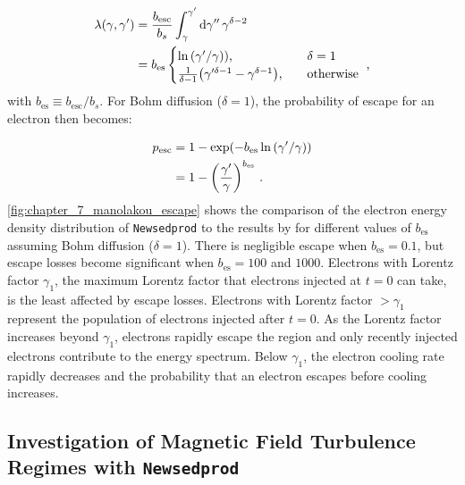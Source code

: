 \begin{equation}
    \begin{aligned}
   	 \lambda\qty(\gamma,\gamma')&=\frac{b_\text{esc}}{b_s}\int_\gamma^{\gamma'}\dd{\gamma''}\gamma^{\delta-2} \\
  	  &=b_\text{es}
  	  \begin{cases}
  		  \ln\qty({\gamma'}/{\gamma}))\text{,}\quad &\delta =1 \\
  		  \frac{1}{\delta-1}\qty(\gamma'^{\delta-1}-\gamma^{\delta -1})\text{,}\quad&\text{otherwise}
    	\end{cases}\text{ ,}
    \end{aligned} \label{eq:chapter_7_lambda_plus_diffusion}
\end{equation}
\noindent with $b_\text{es}\equiv b_\text{esc}/b_s$. For Bohm diffusion ($\delta=1$), the probability of escape for an electron then becomes:

\begin{equation}
    \begin{aligned}
    p_\text{esc}&=1-\exp(-b_\text{es}\ln\qty(\gamma'/\gamma)) \\
    &=1-\qty(\frac{\gamma'}{\gamma})^{b_\text{es}}\text{ .}
    \end{aligned}
\end{equation}
\newpar
\autoref{fig:chapter_7_manolakou_escape} shows the comparison of the electron energy density distribution of {\tt Newsedprod} to the results  by \cite{2007A&A...474..689M} for different values of $b_\text{es}$ assuming Bohm diffusion ($\delta=1$). There is negligible escape when $b_\text{es}=0.1$, but escape losses become significant when $b_\text{es}=100$ and $1000$. Electrons with Lorentz factor $\gamma_1$, the maximum Lorentz factor that electrons injected at $t=0$ can take, is the least affected by escape losses. Electrons with Lorentz factor $>\gamma_1$ represent the population of electrons injected after $t=0$. As the Lorentz factor increases beyond $\gamma_1$, electrons rapidly escape the region and only recently injected electrons contribute to the energy spectrum. Below $\gamma_1$, the electron cooling rate rapidly decreases and the probability that an electron escapes before cooling increases. 

\subsection{Investigation of Magnetic Field Turbulence Regimes with {\tt Newsedprod}}

